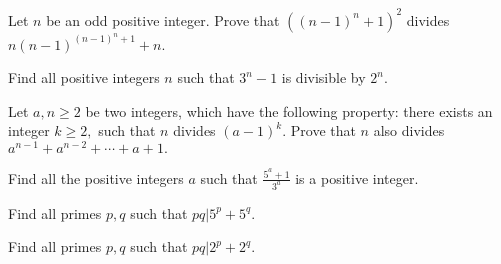 \documentclass[problems.tex]{subfile}
\begin{document}
	
	\begin{problem}
		Let $ n$ be an odd positive integer. Prove that $((n-1)^n+1)^2$ divides $ n(n-1)^{(n-1)^n+1}+n$.
	\end{problem}
	
	\begin{problem}
		Find all positive integers $n$ such that $3^{n}-1$ is divisible by $2^n$.
	\end{problem}
	
	
	\begin{problem}
		Let $ a,n\geq 2$ be two integers, which have the following property: there exists an integer $ k\geq 2,$ such that $ n$ divides $ (a-1)^k.$ Prove that $ n$ also divides $ a^{n-1}+a^{n-2}+\cdots + a + 1.$
	\end{problem}
	
	\begin{problem}
		Find all the positive integers $a$ such that $\frac{5^a + 1}{3^a}$ is a positive integer.
	\end{problem}
	
	\begin{problem}
		Find all primes $p,q$ such that $pq|5^p+5^q$.
	\end{problem}
	
	\begin{problem}
		Find all primes $p,q$ such that $pq|2^p+2^q$.
	\end{problem}
	
	
\end{document}
